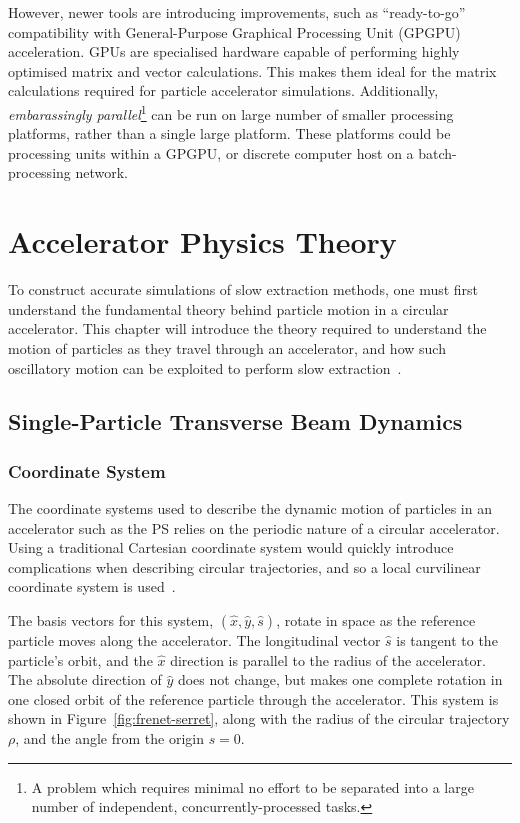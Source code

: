 \documentclass[11pt]{report}
\begin{document}
However, newer tools are introducing improvements, such as ``ready-to-go'' compatibility with General-Purpose Graphical Processing Unit (GPGPU) acceleration. GPUs are specialised hardware capable of performing highly optimised matrix and vector calculations. This makes them ideal for the matrix calculations required for particle accelerator simulations. Additionally, \textit{embarassingly parallel}\footnote{A problem which requires minimal no effort to be separated into a large number of independent, concurrently-processed tasks.} can be run on large number of smaller processing platforms, rather than a single large platform. These platforms could be processing units within a GPGPU, or discrete computer host on a batch-processing network.

\chapter{Accelerator Physics Theory}\label{chap:theory}

To construct accurate simulations of slow extraction methods, one must first understand the fundamental theory behind particle motion in a circular accelerator. This chapter will introduce the theory required to understand the motion of particles as they travel through an accelerator, and how such oscillatory motion can be exploited to perform slow extraction~\cite{Wiedemann}.
\section{Single-Particle Transverse Beam Dynamics}

\subsection{Coordinate System}

The coordinate systems used to describe the dynamic motion of particles in an accelerator such as the PS relies on the periodic nature of a circular accelerator. Using a traditional Cartesian coordinate system would quickly introduce complications when describing circular trajectories, and so a local curvilinear coordinate system is used~\cite{BDSIM}.

The basis vectors for this system, $(\hat x, \hat y, \hat s)$, rotate in space as the reference particle moves along the accelerator. The longitudinal vector $\hat s$ is tangent to the particle's orbit, and the $\hat x$ direction is parallel to the radius of the accelerator. The absolute direction of $\hat y$ does not change, but makes one complete rotation in one closed orbit of the reference particle through the accelerator. This system is shown in Figure~\ref{fig:frenet-serret}, along with the radius of the circular trajectory $\rho$, and the angle from the origin $s=0$. 
\end{document}
